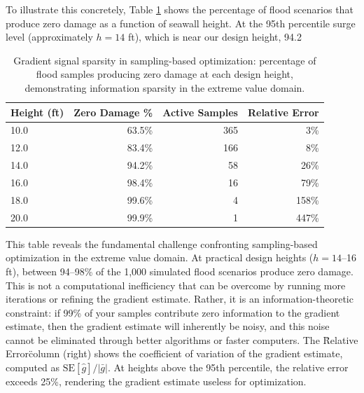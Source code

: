 \documentclass[review]{elsarticle}
\begin{document}
To illustrate this concretely, Table \ref{tab:gradient_sparsity} shows the percentage of flood scenarios that produce zero damage as a function of seawall height. At the 95th percentile surge level (approximately $h = 14$ ft), which is near our design height, 94.2%

\begin{table}[ht]
\centering
\caption{Gradient signal sparsity in sampling-based optimization: percentage of flood samples producing zero damage at each design height, demonstrating information sparsity in the extreme value domain.}
\label{tab:gradient_sparsity}
\begin{tabular}{lrrr}
\toprule
\textbf{Height (ft)} & \textbf{Zero Damage \%} & \textbf{Active Samples} & \textbf{Relative Error} \\
\midrule
10.0 & 63.5\% & 365 & 3\% \\
12.0 & 83.4\% & 166 & 8\% \\
14.0 & 94.2\% & 58 & 26\% \\
16.0 & 98.4\% & 16 & 79\% \\
18.0 & 99.6\% & 4 & 158\% \\
20.0 & 99.9\% & 1 & 447\% \\
\bottomrule
\end{tabular}
\end{table}

This table reveals the fundamental challenge confronting sampling-based optimization in the extreme value domain. At practical design heights ($h = 14$--16 ft), between 94--98\% of the 1,000 simulated flood scenarios produce zero damage. This is not a computational inefficiency that can be overcome by running more iterations or refining the gradient estimate. Rather, it is an information-theoretic constraint: if 99\% of your samples contribute zero information to the gradient estimate, then the gradient estimate will inherently be noisy, and this noise cannot be eliminated through better algorithms or faster computers. The \"Relative Error\" column (right) shows the coefficient of variation of the gradient estimate, computed as $\text{SE}[\hat{g}]/|\bar{g}|$. At heights above the 95th percentile, the relative error exceeds 25\%, rendering the gradient estimate useless for optimization.
\end{document}

